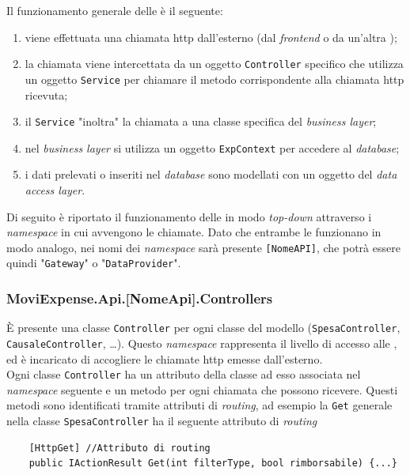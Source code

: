 \noindent Il funzionamento generale delle  è il seguente:
\begin{enumerate}
    \item viene effettuata una chiamata http dall'esterno (dal \textit{frontend} o da un'altra );
    \item la chiamata viene intercettata da un oggetto \texttt{Controller} specifico che utilizza un oggetto \texttt{Service} per chiamare il metodo corrispondente alla chiamata http ricevuta;
    \item il \texttt{Service} "inoltra" la chiamata a una classe specifica del \textit{business layer};
    \item nel \textit{business layer} si utilizza un oggetto \texttt{ExpContext} per accedere al \textit{database};
    \item i dati prelevati o inseriti nel \textit{database} sono modellati con un oggetto del \textit{data access layer}.
\end{enumerate}

\noindent Di seguito è riportato il funzionamento delle  in modo \textit{top-down} attraverso i \textit{namespace} in cui avvengono le chiamate. Dato che entrambe le  funzionano in modo analogo, nei nomi dei \textit{namespace} sarà presente \texttt{[NomeAPI]}, che potrà essere quindi "\texttt{Gateway}" o "\texttt{DataProvider}".

\subsubsection{MoviExpense.Api.[NomeApi].Controllers}

È presente una classe \texttt{Controller} per ogni classe del modello (\texttt{SpesaController}, \texttt{CausaleController}, \dots). Questo \textit{namespace} rappresenta il livello di accesso alle , ed è incaricato di accogliere le chiamate http emesse dall'esterno.\\
Ogni classe \texttt{Controller} ha un attributo della classe ad esso associata nel \textit{namespace} seguente e un metodo per ogni chiamata che possono ricevere. Questi metodi sono identificati tramite attributi di \textit{routing}, ad esempio la \texttt{Get} generale nella classe \texttt{SpesaController} ha il seguente attributo di \textit{routing}

\begin{verbatim}
    [HttpGet] //Attributo di routing
    public IActionResult Get(int filterType, bool rimborsabile) {...}
\end{verbatim}

